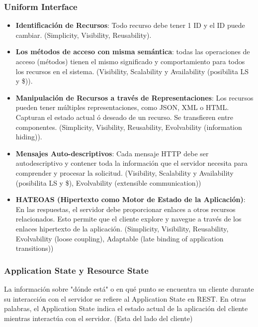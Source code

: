 \documentclass{article}
\begin{document}
		\subsubsection{Uniform Interface}
		\begin{itemize}		
			\item \textbf{Identificación de Recursos}: Todo recurso debe tener 1 ID y el ID puede cambiar. (Simplicity, Visibility, Reusability).
			
			\item \textbf{Los métodos de acceso con misma semántica}: todas las operaciones de acceso (métodos) tienen el mismo significado y comportamiento para todos los recursos en el sistema. (Visibility, Scalability y Availability (posibilita LS y \$)).
			
			\item \textbf{Manipulación de Recursos a través de Representaciones}: Los recursos pueden tener múltiples representaciones, como JSON, XML o HTML. Capturan el estado actual ó deseado de un recurso. Se transfieren entre componentes. (Simplicity, Visibility, Reusability,
			Evolvability (information hiding)).
			
			\item \textbf{Mensajes Auto-descriptivos}: Cada mensaje HTTP debe ser autodescriptivo y contener toda la información que el servidor necesita para comprender y procesar la solicitud. (Visibility, Scalability y Availability (posibilita LS y \$), Evolvability (extensible communication))
			
			\item \textbf{HATEOAS (Hipertexto como Motor de Estado de la Aplicación)}: En las respuestas, el servidor debe proporcionar enlaces a otros recursos relacionados. Esto permite que el cliente explore y navegue a través de los enlaces hipertexto de la aplicación. (Simplicity, Visibility, Reusability, Evolvability (loose coupling), Adaptable (late binding of application transitions))
		\end{itemize}
		
		
		\subsubsection{Application State y Resource State}
		La información sobre "dónde está" o en qué punto se encuentra un cliente durante su interacción con el servidor se refiere al Application State en REST. En otras palabras, el Application State indica el estado actual de la aplicación del cliente mientras interactúa con el servidor. (Esta del lado del cliente)
		
\end{document}

